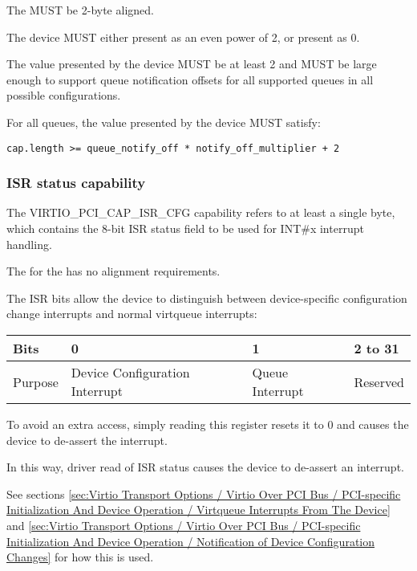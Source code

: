 The  MUST be 2-byte aligned.  

The device MUST either present  as an even power of 2,
or present  as 0.

The value  presented by the device MUST be at least 2
and MUST be large enough to support queue notification offsets
for all supported queues in all possible configurations.

For all queues, the value  presented by the device MUST satisfy:
\begin{lstlisting}
cap.length >= queue_notify_off * notify_off_multiplier + 2
\end{lstlisting}

\subsubsection{ISR status capability}\label{sec:Virtio Transport Options / Virtio Over PCI Bus / PCI Device Layout / ISR status capability}

The VIRTIO_PCI_CAP_ISR_CFG capability
refers to at least a single byte, which contains the 8-bit ISR status field
to be used for INT\#x interrupt handling.

The  for the  has no alignment requirements.

The ISR bits allow the device to distinguish between device-specific configuration
change interrupts and normal virtqueue interrupts:

\begin{tabular}{ |l||l|l|l| }
\hline
Bits       & 0                               & 1               &  2 to 31 \\
\hline
Purpose    & Device Configuration Interrupt  & Queue Interrupt & Reserved \\
\hline
\end{tabular}

To avoid an extra access, simply reading this register resets it to 0 and
causes the device to de-assert the interrupt.

In this way, driver read of ISR status causes the device to de-assert
an interrupt.

See sections \ref{sec:Virtio Transport Options / Virtio Over PCI Bus / PCI-specific Initialization And Device Operation / Virtqueue Interrupts From The Device} and \ref{sec:Virtio Transport Options / Virtio Over PCI Bus / PCI-specific Initialization And Device Operation / Notification of Device Configuration Changes} for how this is used.

